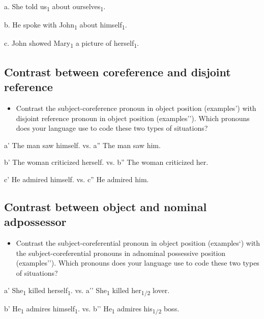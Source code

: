 \documentclass[output=paper]{langsci/langscibook} \label{AppendixA}
\begin{document}
a. She told us\textsubscript{1} about ourselves\textsubscript{1}. 



b. He spoke with John\textsubscript{1} about himself\textsubscript{1}. 



c. John showed Mary\textsubscript{1} a picture of herself\textsubscript{1}. 


\subsection{Contrast between coreference and disjoint reference} 
\begin{itemize}
\item
Contrast the subject-coreference pronoun in object position (examples’) with disjoint reference pronoun in object position (examples’’). Which pronouns does your language use to code these two types of situations? 

\end{itemize}

a' The man saw himself.     vs.   a” The man saw him. 



b' The woman criticized herself.   vs.   b” The woman criticized her. 



c' He admired himself.     vs.   c” He admired him. 


\subsection{Contrast between object and nominal adpossessor} 
\begin{itemize}
\item
Contrast the subject-coreferential pronoun in object position (examples‘) with the subject-coreferential pronouns in adnominal possessive position (examples’’). Which pronouns does your language use to code these two types of situations? 

\end{itemize}

a’ She\textsubscript{1} killed herself\textsubscript{1}.    vs.   a’’ She\textsubscript{1} killed her\textsubscript{1/2} lover. 



b' He\textsubscript{1} admires himself\textsubscript{1}.  vs.   b’’ He\textsubscript{1} admires his\textsubscript{1/2} boss. 
\end{document}
